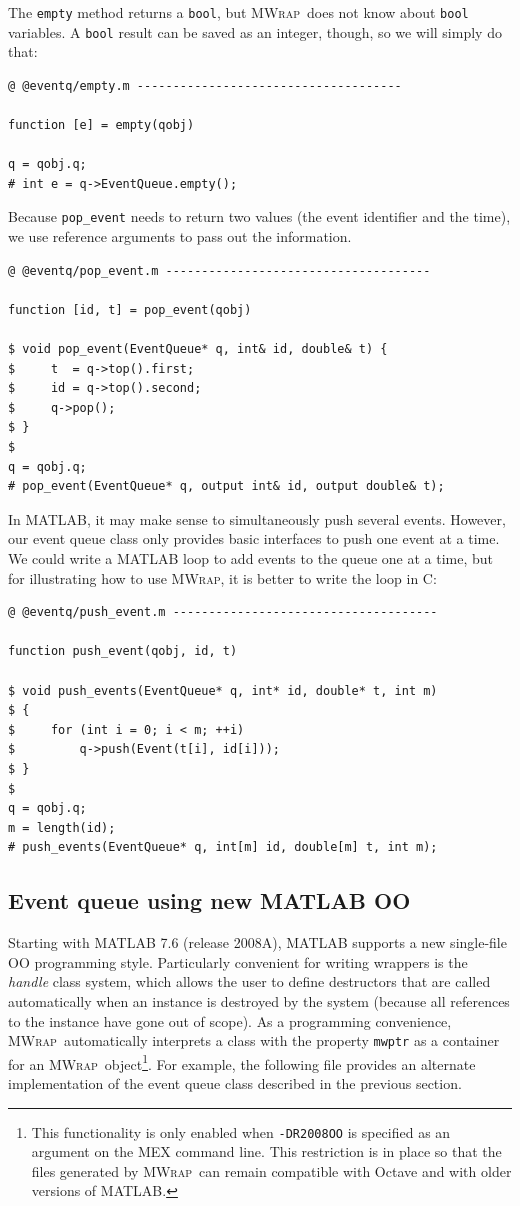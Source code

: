 \documentclass[12pt]{article}
\newcommand{\mwrap}{\textsc{MWrap}}
\begin{document}
The {\tt empty} method returns a {\tt bool}, but \mwrap\ does not
know about {\tt bool} variables.  A {\tt bool} result can be saved
as an integer, though, so we will simply do that:
\begin{verbatim}
@ @eventq/empty.m -------------------------------------

function [e] = empty(qobj)

q = qobj.q;
# int e = q->EventQueue.empty();
\end{verbatim}

Because {\tt pop\_event} needs to return two values (the event identifier
and the time), we use reference arguments to pass out the information.
\begin{verbatim}
@ @eventq/pop_event.m -------------------------------------

function [id, t] = pop_event(qobj)

$ void pop_event(EventQueue* q, int& id, double& t) {
$     t  = q->top().first;
$     id = q->top().second;
$     q->pop();
$ }
$
q = qobj.q;
# pop_event(EventQueue* q, output int& id, output double& t);
\end{verbatim}

In MATLAB, it may make sense to simultaneously push several events.
However, our event queue class only provides basic interfaces to
push one event at a time.  We could write a MATLAB loop to add events
to the queue one at a time, but for illustrating how to use \mwrap,
it is better to write the loop in C:
\begin{verbatim}
@ @eventq/push_event.m -------------------------------------

function push_event(qobj, id, t)

$ void push_events(EventQueue* q, int* id, double* t, int m)
$ {
$     for (int i = 0; i < m; ++i)
$         q->push(Event(t[i], id[i]));
$ }
$
q = qobj.q;
m = length(id);
# push_events(EventQueue* q, int[m] id, double[m] t, int m);
\end{verbatim}

\subsection{Event queue using new MATLAB OO}

Starting with MATLAB 7.6 (release 2008A), MATLAB supports a new single-file
OO programming style.  Particularly convenient for writing wrappers is the
{\em handle} class system, which allows the user to define destructors that
are called automatically when an instance is destroyed by the system (because
all references to the instance have gone out of scope).  As a programming
convenience, \mwrap\ automatically interprets a class with the property
{\tt mwptr} as a container for an \mwrap\ object\footnote{This functionality
  is only enabled when {\tt -DR2008OO} is specified as an argument on the
  MEX command line.  This restriction is in place so that the files generated
  by \mwrap\ can remain compatible with Octave and with older versions
  of MATLAB.}.  
For example, the following file provides an alternate implementation
of the event queue class described in the previous section.
\end{document}
